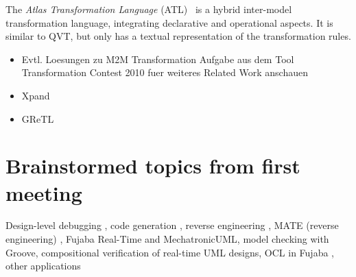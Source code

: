 The \emph{Atlas Transformation Language} (ATL)~\cite{ATL} is a hybrid inter-model transformation language, integrating declarative and operational aspects.
It is similar to QVT, but only has a textual representation of the transformation rules.


\begin{itemize}
 \item Evtl. Loesungen zu M2M Transformation Aufgabe aus dem Tool Transformation Contest 2010 fuer weiteres Related Work anschauen
 \item Xpand
 \item GReTL \cite{HE11}
\end{itemize}


\section{Brainstormed topics from first meeting}


Design-level debugging \cite{GZ02,Gei02,GZ06},
code generation \cite{GSR05,GBD07},
reverse engineering \cite{NSW+02,BGS+Z08}, MATE (reverse engineering) \cite{SKS+07,ST08},
Fujaba Real-Time and MechatronicUML,
model checking with Groove,
compositional verification of real-time UML designs,
OCL in Fujaba \cite{SZG07},
other applications \cite{KNNZ00_ag,GZ10}

